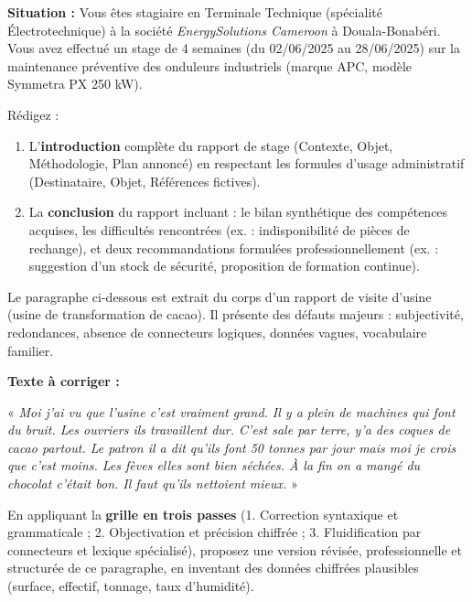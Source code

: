 \documentclass[11pt]{article}
\begin{document}
\begin{exercice}
\textbf{Situation :} Vous êtes stagiaire en Terminale Technique (spécialité Électrotechnique) à la société \emph{EnergySolutions Cameroon} à Douala-Bonabéri. Vous avez effectué un stage de 4 semaines (du 02/06/2025 au 28/06/2025) sur la maintenance préventive des onduleurs industriels (marque APC, modèle Symmetra PX 250 kW).

Rédigez :
\begin{enumerate}
\item L'\textbf{introduction} complète du rapport de stage (Contexte, Objet, Méthodologie, Plan annoncé) en respectant les formules d'usage administratif (Destinataire, Objet, Références fictives).
\item La \textbf{conclusion} du rapport incluant : le bilan synthétique des compétences acquises, les difficultés rencontrées (ex. : indisponibilité de pièces de rechange), et deux recommandations formulées professionnellement (ex. : suggestion d'un stock de sécurité, proposition de formation continue).
\end{enumerate}
\end{exercice}

\begin{exercice}
Le paragraphe ci-dessous est extrait du corps d'un rapport de visite d'usine (usine de transformation de cacao). Il présente des défauts majeurs : subjectivité, redondances, absence de connecteurs logiques, données vagues, vocabulaire familier.

\textbf{Texte à corriger :}

« \emph{Moi j'ai vu que l'usine c'est vraiment grand. Il y a plein de machines qui font du bruit. Les ouvriers ils travaillent dur. C'est sale par terre, y'a des coques de cacao partout. Le patron il a dit qu'ils font 50 tonnes par jour mais moi je crois que c'est moins. Les fèves elles sont bien séchées. À la fin on a mangé du chocolat c'était bon. Il faut qu'ils nettoient mieux.} »

En appliquant la \textbf{grille en trois passes} (1. Correction syntaxique et grammaticale ; 2. Objectivation et précision chiffrée ; 3. Fluidification par connecteurs et lexique spécialisé), proposez une version révisée, professionnelle et structurée de ce paragraphe, en inventant des données chiffrées plausibles (surface, effectif, tonnage, taux d'humidité).
\end{exercice}
\end{document}

